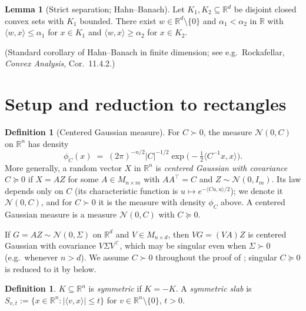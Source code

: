 \documentclass[14pt]{extarticle}
\theoremstyle{definition}
\newtheorem{lemma}[theorem]{Lemma}
\newtheorem{definition}[theorem]{Definition}
\newcommand{\R}{\mathbb{R}}
\newcommand{\caln}{\mathcal{N}}
\begin{document}
\begin{lemma}[Strict separation; Hahn--Banach]\label{lem:separation}
  Let $K_1,K_2\subseteq\R^d$ be disjoint closed convex sets with $K_1$
  bounded.  There exist $w\in\R^d\setminus\{0\}$ and $\alpha_1<\alpha_2$
  in $\R$ with $\langle w,x\rangle\leqslant\alpha_1$ for $x\in K_1$ and
  $\langle w,x\rangle\geqslant\alpha_2$ for $x\in K_2$.
\end{lemma}

(Standard corollary of Hahn--Banach in finite dimension; see e.g.\
Rockafellar, \emph{Convex Analysis}, Cor.\ 11.4.2.)


\section{Setup and reduction to rectangles}\label{sec:setup}

\begin{definition}[Centered Gaussian measure]\label{def:gaussian}
  For $C\succ 0$, the measure $\caln(0,C)$ on $\R^n$ has density
  \[
    \phi_C(x)
    \;=\;
    (2\pi)^{-n/2}|C|^{-1/2}
    \exp\bigl(-\tfrac{1}{2}\langle C^{-1}x,x\rangle\bigr).
  \]
  More generally, a random vector $X$ in $\R^n$ is \emph{centered
  Gaussian with covariance $C\succcurlyeq 0$} if $X=AZ$ for some
  $A\in M_{n\times m}$ with $AA^\top=C$ and $Z\sim\caln(0,I_m)$.  Its law
  depends only on $C$ (its characteristic function is
  $u\mapsto e^{-\langle Cu,u\rangle/2}$); we denote it $\caln(0,C)$, and
  for $C\succ 0$ it is the measure with density $\phi_C$ above.  A
  centered Gaussian measure is a measure $\caln(0,C)$ with
  $C\succcurlyeq 0$.
\end{definition}

If $G=AZ\sim\caln(0,\Sigma)$ on $\R^d$ and $V\in M_{n\times d}$, then
$VG=(VA)Z$ is centered Gaussian with covariance $V\Sigma V^\top$, which
may be singular even when $\Sigma\succ 0$ (e.g.\ whenever $n>d$).  We
assume $C\succ 0$ throughout the proof of \Cref{thm:gcc2}; singular
$C\succcurlyeq 0$ is reduced to it by \Cref{lem:singular} below.

\begin{definition}\label{def:symconvex}
  $K\subseteq\R^n$ is \emph{symmetric} if $K=-K$.  A \emph{symmetric
  slab} is
  $S_{v,t}:=\{x\in\R^n:|\langle v,x\rangle|\leqslant t\}$ for
  $v\in\R^n\setminus\{0\}$, $t>0$.
\end{definition}
\end{document}
